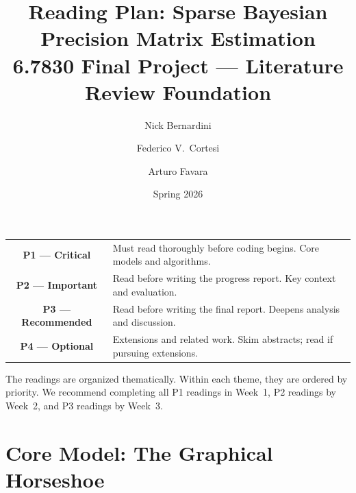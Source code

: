 \documentclass[11pt,a4paper]{article}
\title{\textbf{Reading Plan: Sparse Bayesian Precision Matrix Estimation}\\[0.3em]
\large 6.7830 Final Project --- Literature Review Foundation}
\author{Nick Bernardini \and Federico V.\ Cortesi \and Arturo Favara}
\date{Spring 2026}
\begin{document}
\maketitle

\begin{legend}
\begin{tabular}{@{}cl@{}}
\textcolor{P1}{\textbf{P1 --- Critical}} & Must read thoroughly before coding begins. Core models and algorithms. \\
\textcolor{P2}{\textbf{P2 --- Important}} & Read before writing the progress report. Key context and evaluation. \\
\textcolor{P3}{\textbf{P3 --- Recommended}} & Read before writing the final report. Deepens analysis and discussion. \\
\textcolor{P4}{\textbf{P4 --- Optional}} & Extensions and related work. Skim abstracts; read if pursuing extensions. \\
\end{tabular}
\end{legend}

\bigskip

The readings are organized thematically. Within each theme, they are ordered by priority. We recommend completing all P1 readings in Week~1, P2 readings by Week~2, and P3 readings by Week~3.

\section{Core Model: The Graphical Horseshoe}
\end{document}

